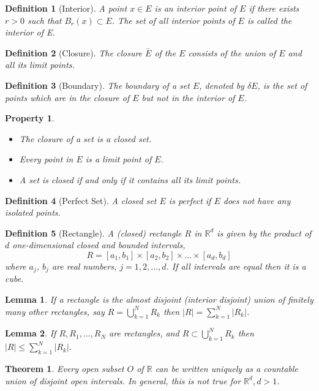 \documentclass{report}
\newtheorem{thm}{Theorem}
\newtheorem{defn}{Definition}
\newtheorem{lemma}{Lemma}
\newtheorem{property}{Property}
\newcommand{\reals}{\mathbb{R}}
\newcommand{\union}{\bigcup}
\begin{document}
\begin{defn}[Interior]
	A point $x \in E$ is an interior point of $E$ if there exists $r > 0$ such that $B_r(x) \subset E$. The set of all interior points of $E$ is called the interior of E.
\end{defn}
\begin{defn}[Closure]
	The closure $\bar{E}$ of the $E$ consists of the union of $E$ and all
	its limit points.
\end{defn}
\begin{defn}[Boundary]
	The boundary of a set $E$, denoted by $\delta E$, is the set of	points which are in the closure of $E$ but not in the interior of $E$.
\end{defn}
\begin{property}\item
	\begin{itemize}
		\item The closure of a set is a closed set.
		\item Every point in $E$ is a limit point of $E$.
		\item A set is closed if and only if it contains all its limit points.
	\end{itemize}
\end{property}
\begin{defn}[Perfect Set]
	A closed set $E$ is perfect if $E$ does not have any isolated points.
\end{defn}

\begin{defn}[Rectangle]
	A (closed) rectangle $R$ in $\reals^d$ is given by the product of $d$ one-dimensional
	closed and bounded intervals,
	$$R = [a_1, b_1] \times [a_2, b_2] \times \dots \times [a_d, b_d]$$
	where $a_j$, $b_j$ are real numbers, $j = 1, 2, \dots, d$. If all intervals are equal then it is a cube.
\end{defn}

\begin{lemma}
	If a rectangle is the almost disjoint (interior disjoint) union of finitely many other rectangles, say $R = \union_{k=1}^N R_k $ then $|R| = \sum_{k=1}^{N} |R_k|$.
\end{lemma}

\begin{lemma}
	If $R, R_1, \dots,R_N$ are rectangles, and $R \subset \union_{k=1}^{N} R_k $ then$|R| \leq \sum_{k=1}^{N} |R_k|$.
\end{lemma}

\begin{thm}
	Every open subset $O$ of $\reals$ can be written uniquely as a countable union of disjoint open intervals. In general, this is not true for $\reals^d, d > 1$.
\end{thm}
\end{document}
